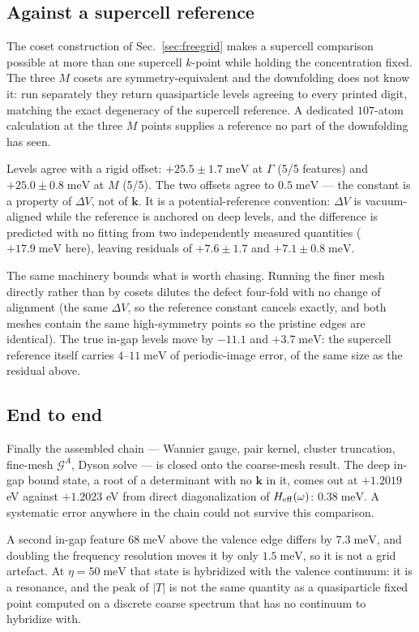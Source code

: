 \documentclass[aps,prx,reprint,superscriptaddress,nofootinbib,longbibliography]{revtex4-2}
\newcommand{\dV}{\Delta V}
\newcommand{\kk}{\mathbf{k}}
\newcommand{\meV}{\;\mathrm{meV}}
\begin{document}
\subsection{Against a supercell reference}
\label{sec:truth}

The coset construction of Sec.~\ref{sec:freegrid} makes a supercell comparison
possible at more than one supercell $k$-point while holding the concentration
fixed. The three $M$ cosets are symmetry-equivalent and the downfolding does not
know it: run separately they return quasiparticle levels agreeing to every
printed digit, matching the exact degeneracy of the supercell reference. A
dedicated $107$-atom calculation at the three $M$ points supplies a reference no
part of the downfolding has seen.

Levels agree with a rigid offset: $+25.5 \pm 1.7\meV$ at $\Gamma$ (5/5
features) and $+25.0 \pm 0.8\meV$ at $M$ (5/5). The two offsets agree to
$0.5\meV$ --- the constant is a property of $\dV$, not of $\kk$. It is a
potential-reference convention: $\dV$ is vacuum-aligned while the reference is
anchored on deep levels, and the difference is predicted with no fitting from
two independently measured quantities ($+17.9\meV$ here), leaving residuals of
$+7.6 \pm 1.7$ and $+7.1 \pm 0.8\meV$.

The same machinery bounds what is worth chasing. Running the finer mesh
directly rather than by cosets dilutes the defect four-fold with no change of
alignment (the same $\dV$, so the reference constant cancels exactly, and both
meshes contain the same high-symmetry points so the pristine edges are
identical). The true in-gap levels move by $-11.1$ and $+3.7\meV$: the
supercell reference itself carries $4$--$11\meV$ of periodic-image error, of
the same size as the residual above.

\subsection{End to end}

Finally the assembled chain --- Wannier gauge, pair kernel, cluster truncation,
fine-mesh $\mathcal{G}^A$, Dyson solve --- is closed onto the coarse-mesh
result. The deep in-gap bound state, a root of a determinant with no $\kk$ in
it, comes out at $+1.2019$ eV against $+1.2023$ eV from direct diagonalization
of $H_{\rm eff}(\omega)$: $0.38\meV$. A systematic error anywhere in the chain
could not survive this comparison.

A second in-gap feature $68\meV$ above the valence edge differs by $7.3\meV$,
and doubling the frequency resolution moves it by only $1.5\meV$, so it is not a
grid artefact. At $\eta = 50\meV$ that state is hybridized with the valence
continuum: it is a resonance, and the peak of $|T|$ is not the same quantity as
a quasiparticle fixed point computed on a discrete coarse spectrum that has no
continuum to hybridize with.
\end{document}
